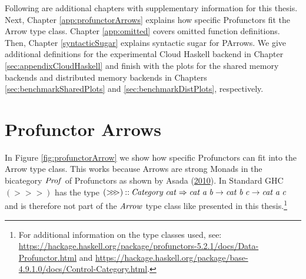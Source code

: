 \documentclass[paper=A4,twoside=true,openright,parskip=full,chapterprefix=true,headings=normal,bibliography=totoc,listof=totoc,titlepage=on,captions=tableabove,draft=false,british]{scrreprt}%
\begin{document}
Following are additional chapters with supplementary information for
this thesis. Next, Chapter \ref{app:profunctorArrows} explains how
specific Profunctors fit the Arrow type class. Chapter \ref{app:omitted}
covers omitted function definitions. Then, Chapter \ref{syntacticSugar}
explains syntactic sugar for PArrows. We give additional definitions for
the experimental Cloud Haskell backend in Chapter
\ref{sec:appendixCloudHaskell} and finish with the plots for the shared
memory backends and distributed memory backends in Chapters
\ref{sec:benchmarkSharedPlots} and \ref{sec:benchmarkDistPlots},
respectively.

\hypertarget{profunctor-arrows}{%
\section{Profunctor Arrows}\label{profunctor-arrows}}

\label{app:profunctorArrows}

In Figure \ref{fig:profunctorArrow} we show how specific Profunctors can
fit into the Arrow type class. This works because Arrows are strong
Monads in the bicategory \ensuremath{\Conid{Prof}} of Profunctors as shown by Asada
(\protect\hyperlink{ref-Asada:2010:ASM:1863597.1863607}{2010}). In
Standard GHC \ensuremath{(\mathbin{>\!\!>\!\!>})} has the type
\ensuremath{(\mathbin{>\!\!>\!\!>})\mathbin{::}\Conid{Category}\;\Varid{cat}\Rightarrow \Varid{cat}\;\Varid{a}\;\Varid{b}\to \Varid{cat}\;\Varid{b}\;\Varid{c}\to \Varid{cat}\;\Varid{a}\;\Varid{c}} and is
therefore not part of the \ensuremath{\Conid{Arrow}} type class like presented in this
thesis.\footnote{For additional information on the type classes used,
  see:
  \url{https://hackage.haskell.org/package/profunctors-5.2.1/docs/Data-Profunctor.html}
  and
  \url{https://hackage.haskell.org/package/base-4.9.1.0/docs/Control-Category.html}.}
\end{document}
